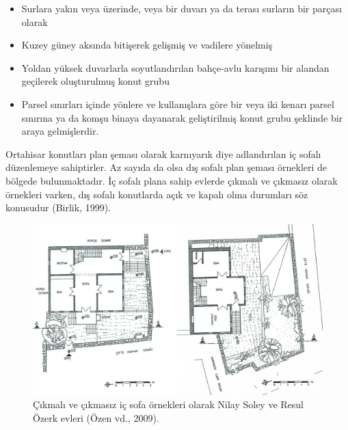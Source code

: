 \documentclass[12pt,turkish,a4paperpaper,]{report}
\providecommand{\tightlist}{%
  \setlength{\itemsep}{0pt}\setlength{\parskip}{0pt}}
\begin{document}
\begin{itemize}
\tightlist
\item
  Surlara yakın veya üzerinde, veya bir duvarı ya da terası surların bir
  parçası olarak
\item
  Kuzey güney aksında bitişerek gelişmiş ve vadilere yönelmiş
\item
  Yoldan yüksek duvarlarla soyutlandırılan bahçe-avlu karışımı bir
  alandan geçilerek oluşturulmuş konut grubu
\item
  Parsel sınırları içinde yönlere ve kullanışlara göre bir veya iki
  kenarı parsel sınırına ya da komşu binaya dayanarak geliştirilmiş
  konut grubu şeklinde bir araya gelmişlerdir. 
\end{itemize}

Ortahisar konutları plan şeması olarak karnıyarık diye adlandırılan iç
sofalı düzenlemeye sahiptirler. Az sayıda da olsa dış sofalı plan şeması
örnekleri de bölgede bulunmaktadır. İç sofalı plana sahip evlerde
çıkmalı ve çıkmasız olarak örnekleri varken, dış sofalı konutlarda açık
ve kapalı olma durumları söz konusudur (Birlik, 1999).

\begin{figure}
\centering
\includegraphics[width=1\textwidth,height=\textheight]{source/figures/SofaliPlanlar.jpg}
\caption{Çıkmalı ve çıkmasız iç sofa örnekleri olarak Nilay Soley ve
Resul Özerk evleri (Özen vd., 2009).}
\end{figure}
\end{document}
